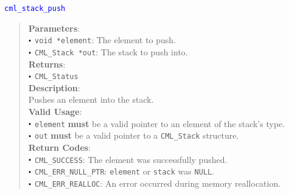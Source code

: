 \documentclass[a4paper,oneside,8pt]{extarticle}
\newcommand{\function}[1]{
  \noindent\textcolor{blue}{\texttt{#1}}
  \vspace{-0.3em}
}
\renewcommand{\dot}{\raisebox{0.3ex}{\scalebox{0.6}{$\bullet$}}}
\theoremstyle{definition}
\begin{document}
\function{cml\_stack\_push}
\begin{quote}
  \textbf{Parameters}: \\
  $\dot$ \texttt{void *element}: The element to push. \\
  $\dot$ \texttt{CML\_Stack *out}: The stack to push into. \\
  \textbf{Returns}: \\
  $\dot$ \texttt{CML\_Status} \\
  
  \vspace{-0.75em}
  \textbf{Description}: \\
  Pushes an element into the stack. \\

  \vspace{-0.75em}
  \textbf{Valid Usage}: \\
  $\dot$ \texttt{element} \textbf{must} be a valid pointer to an element of the stack's type. \\
  $\dot$ \texttt{out} \textbf{must} be a valid pointer to a \texttt{CML\_Stack} structure. \\

  \vspace{-0.75em}
  \textbf{Return Codes}: \\
  $\dot$ \texttt{CML\_SUCCESS}: The element was successfully pushed. \\
  $\dot$ \texttt{CML\_ERR\_NULL\_PTR}: \texttt{element} or \texttt{stack} was \texttt{NULL}. \\
  $\dot$ \texttt{CML\_ERR\_REALLOC}: An error occurred during memory reallocation. \\
\end{quote}
\end{document}
